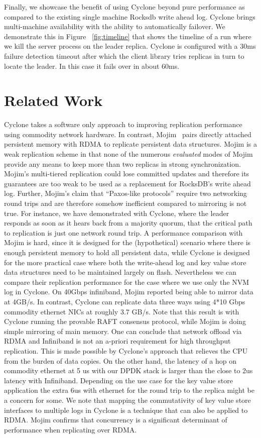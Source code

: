 \documentclass[pageno]{jpaper}
\begin{document}
Finally, we showcase the benefit of using Cyclone beyond pure performance as
compared to the existing single machine Rocksdb write ahead log. Cyclone brings
multi-machine availability with the ability to automatically failover. We
demonstrate this in Figure ~\ref{fig:timeline} that shows the timeline of a run
where we kill the server process on the leader replica. Cyclone is configured 
with a 30ms failure detection timeout after which the client library tries
replicas in turn to locate the leader. In this case it fails over in about
60ms.

\section{Related Work}

Cyclone takes a software only approach to improving replication performance
using commodity network hardware. In contrast, Mojim~\cite{mojim} pairs directly
attached persistent memory with RDMA to replicate persistent data
structures. Mojim is a weak replication scheme in that none of the numerous
\emph{evaluated} modes of Mojim provide any means to keep more than two replicas
in strong synchronization. Mojim's multi-tiered replication could lose committed
updates and therefore its guarantees are too weak to be used as a replacement
for RocksDB's write ahead log. Further, Mojim's claim that
``Paxos-like protocols'' require two networking round trips and are
therefore somehow inefficient compared to mirroring is not true. For instance,
we have demonstrated with Cyclone, where the leader responds as soon as it hears
back from a majority quorum, that the critical path to replication is just one
network round trip.  A performance comparison with Mojim is hard, since it is
designed for the (hypothetical) scenario where there is enough persistent memory
to hold all persistent data, while Cyclone is designed for the more practical
case where both the write-ahead log and key value store data structures need to 
be maintained largely on flash. Nevertheless we can compare their replication
performance for the case where we use only the NVM log in Cyclone. On 40Gbps
infiniband, Mojim reported being able to mirror data at 4GB/s. In contrast,
Cyclone can replicate data three ways using 4*10 Gbps commodity ethernet NICs at
roughly 3.7 GB/s. Note that this result is with Cyclone running the provable
RAFT consensus protocol, while Mojim is doing simple mirroring of main memory.
One can conclude that network offload via RDMA and Infiniband is not an a-priori
requirement for high throughput replication. This is made possible by Cyclone's
approach that relieves the CPU from the burden of data copies. On the other
hand, the latency of a hop on commodity ethernet at 5 us with our DPDK stack is
larger than the close to 2us latency with Infiniband. Depending on the use case
for the key value store application the extra 6us with ethernet for the round
trip to the replica might be a concern for some. We note that mapping the
commutativity of key value store interfaces to multiple logs in Cyclone is a
technique that can also be applied to RDMA. Mojim confirms that concurrency is a
significant determinant of performance when replicating over RDMA.
\end{document}
